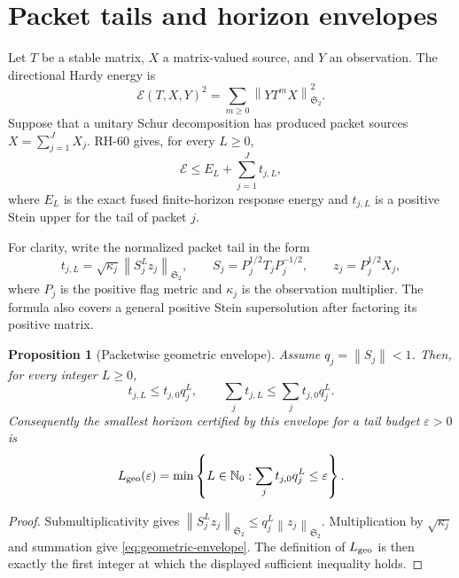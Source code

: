 \documentclass[11pt]{article}
\newtheorem{proposition}[theorem]{Proposition}
\theoremstyle{remark}
\newcommand{\norm}[1]{\left\lVert#1\right\rVert}
\newcommand{\HS}{\mathfrak S_2}
\newcommand{\cE}{\mathcal E}
\begin{document}
\section{Packet tails and horizon envelopes}
\label{sec:setup}

Let $T$ be a stable matrix, $X$ a matrix-valued source, and $Y$ an
observation.  The directional Hardy energy is
\begin{equation}
 \cE(T,X,Y)^2=\sum_{m\ge0}\norm{YT^mX}_{\HS}^2.
 \label{eq:energy}
\end{equation}
Suppose that a unitary Schur decomposition has produced packet sources
$X=\sum_{j=1}^JX_j$.  RH-60 gives, for every $L\ge0$,
\begin{equation}
 \cE\le E_L+\sum_{j=1}^J t_{j,L},
 \label{eq:phase-completion}
\end{equation}
where $E_L$ is the exact fused finite-horizon response energy and
$t_{j,L}$ is a positive Stein upper for the tail of packet $j$.

For clarity, write the normalized packet tail in the form
\begin{equation}
 t_{j,L}=\sqrt{\kappa_j}\norm{S_j^L z_j}_{\HS},
 \qquad
 S_j=P_j^{1/2}T_jP_j^{-1/2},
 \qquad z_j=P_j^{1/2}X_j,
 \label{eq:normalized-tail}
\end{equation}
where $P_j$ is the positive flag metric and $\kappa_j$ is the observation
multiplier.  The formula also covers a general positive Stein
supersolution after factoring its positive matrix.

\begin{proposition}[Packetwise geometric envelope]
\label{prop:geometric}
Assume $q_j=\norm{S_j}<1$.  Then, for every integer $L\ge0$,
\begin{equation}
 t_{j,L}\le t_{j,0}q_j^L,
 \qquad
 \sum_jt_{j,L}\le \sum_jt_{j,0}q_j^L.
 \label{eq:geometric-envelope}
\end{equation}
Consequently the smallest horizon certified by this envelope for a tail
budget $\varepsilon>0$ is
\begin{equation}
 L_{\rm geo}(\varepsilon)=
 \min\left\{L\in\mathbb N_0:
 \sum_jt_{j,0}q_j^L\le\varepsilon\right\}.
 \label{eq:geo-horizon}
\end{equation}
\end{proposition}

\begin{proof}
Submultiplicativity gives
$\norm{S_j^Lz_j}_{\HS}\le q_j^L\norm{z_j}_{\HS}$.
Multiplication by $\sqrt{\kappa_j}$ and summation give
\eqref{eq:geometric-envelope}.  The definition of $L_{\rm geo}$ is then
exactly the first integer at which the displayed sufficient inequality holds.
\end{proof}
\end{document}
